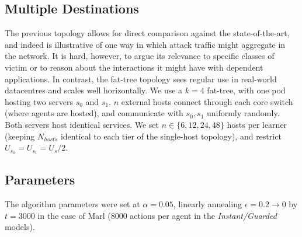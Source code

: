 \documentclass[10pt, times, comsoc]{IEEEtran}
\begin{document}
\subsection{Multiple Destinations}
The previous topology allows for direct comparison against the state-of-the-art, and indeed is illustrative of one way in which attack traffic might aggregate in the network.
It is hard, however, to argue its relevance to specific classes of victim or to reason about the interactions it might have with dependent applications.
In contrast, the fat-tree topology \cite{DBLP:conf/sigcomm/Al-FaresLV08} sees regular use in real-world datacentres and scales well horizontally.
We use a $k=4$ fat-tree, with one pod hosting two servers $s_0$ and $s_1$.
$n$ external hosts connect through each core switch (where agents are hosted), and communicate with $s_0, s_1$ uniformly randomly.
Both servers host identical services.
We set $n \in \{6, 12, 24, 48\}$ hosts per learner (keeping $N_{\mathit{hosts}}$ identical to each tier of the single-host topology), and restrict $U_{s_0} = U_{s_1} = U_s / 2$.

\subsection{Parameters}
The algorithm parameters were set at $\alpha=0.05$, linearly annealing $\epsilon=0.2 \rightarrow 0$ by $t=3000$ in the case of Marl (\num{8000} actions per agent in the \emph{Instant/Guarded} models).
\end{document}
